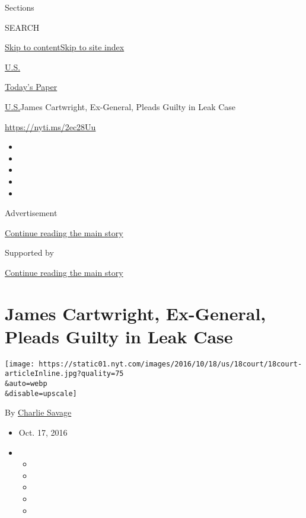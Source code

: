 Sections

SEARCH

\protect\hyperlink{site-content}{Skip to
content}\protect\hyperlink{site-index}{Skip to site index}

\href{https://www.nytimes.com/section/us}{U.S.}

\href{https://myaccount.nytimes.com/auth/login?response_type=cookie\&client_id=vi}{}

\href{https://www.nytimes.com/section/todayspaper}{Today's Paper}

\href{/section/us}{U.S.}\textbar{}James Cartwright, Ex-General, Pleads
Guilty in Leak Case

\url{https://nyti.ms/2ec28Uu}

\begin{itemize}
\item
\item
\item
\item
\item
\end{itemize}

Advertisement

\protect\hyperlink{after-top}{Continue reading the main story}

Supported by

\protect\hyperlink{after-sponsor}{Continue reading the main story}

\hypertarget{james-cartwright-ex-general-pleads-guilty-in-leak-case}{%
\section{James Cartwright, Ex-General, Pleads Guilty in Leak
Case}\label{james-cartwright-ex-general-pleads-guilty-in-leak-case}}

\texttt{[image: https://static01.nyt.com/images/2016/10/18/us/18court/18court-articleInline.jpg?quality=75\\\&auto=webp\\\&disable=upscale]}

By \href{http://www.nytimes.com/by/charlie-savage}{Charlie Savage}

\begin{itemize}
\item
  Oct. 17, 2016
\item
  \begin{itemize}
  \item
  \item
  \item
  \item
  \item
  \end{itemize}
\end{itemize}


